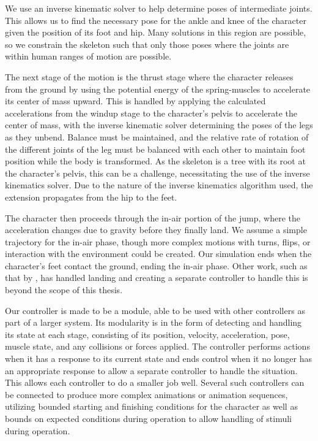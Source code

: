 We use an inverse kinematic solver to help determine poses of intermediate joints.  This allows us to find the necessary pose for the ankle and knee of the character given the position of its foot and hip.  Many solutions in this region are possible, so we constrain the skeleton such that only those poses where the joints are within human ranges of motion are possible.

The next stage of the motion is the thrust stage where the character releases from the ground by using the potential energy of the spring-muscles to accelerate its center of mass upward.  This is handled by applying the calculated accelerations from the windup stage to the character's pelvis to accelerate the center of mass, with the inverse kinematic solver determining the poses of the legs as they unbend.  Balance must be maintained, and the relative rate of rotation of the different joints of the leg must be balanced with each other to maintain foot position while the body is transformed.  As the skeleton is a tree with its root at the character's pelvis, this can be a challenge, necessitating the use of the inverse kinematics solver.  Due to the nature of the inverse kinematics algorithm used, the extension propagates from the hip to the feet.  

The character then proceeds through the in-air portion of the jump, where the acceleration changes due to gravity before they finally land.  We assume a simple trajectory for the in-air phase, though more complex motions with turns, flips, or interaction with the environment could be created.  Our simulation ends when the character's feet contact the ground, ending the in-air phase.  Other work, such as that by \liufall, has handled landing and creating a separate controller to handle this is beyond the scope of this thesis. \cite{falling_landing}

Our controller is made to be a module, able to be used with other controllers as part of a larger system.  Its modularity is in the form of detecting and handling its state at each stage, consisting of its position, velocity, acceleration, pose, muscle state, and any collisions or forces applied. The controller performs actions when it has a response to its current state and ends control when it no longer has an appropriate response to allow a separate controller to handle the situation.  This allows each controller to do a smaller job well. Several such controllers can be connected to produce more complex animations or animation sequences, utilizing bounded starting and finishing conditions for the character as well as bounds on expected conditions during operation to allow handling of stimuli during operation.

